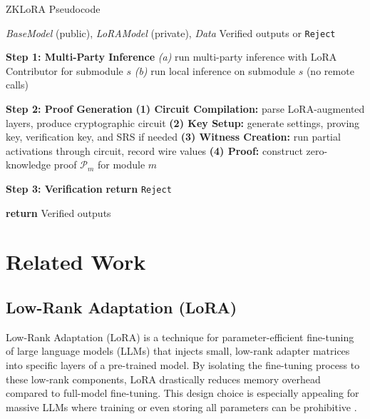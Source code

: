 \documentclass[11pt]{article}
\begin{document}
\begin{algorithm}[H]
\caption{ZKLoRA Pseudocode}
\label{alg:zklora_concise}
\begin{algorithmic}[1]

\Require \textit{BaseModel} (public), \textit{LoRAModel} (private), \textit{Data}
\Ensure Verified outputs or \texttt{Reject}

\Statex

\State \textbf{Step 1: Multi-Party Inference}
    \State \emph{(a)} run multi-party inference with LoRA Contributor for submodule $s$
  \Else
    \State \emph{(b)} run local inference on submodule $s$ (no remote calls)
  \EndIf
\EndFor

\Statex

\State \textbf{Step 2: Proof Generation}
  \State \textbf{(1) Circuit Compilation:} parse LoRA-augmented layers, produce cryptographic circuit
  \State \textbf{(2) Key Setup:} generate settings, proving key, verification key, and SRS if needed
  \State \textbf{(3) Witness Creation:} run partial activations through circuit, record wire values
  \State \textbf{(4) Proof:} construct zero-knowledge proof $\mathcal{P}_m$ for module $m$
\EndFor

\Statex

\State \textbf{Step 3: Verification}
    \State \textbf{return} \texttt{Reject}
  \EndIf
\EndFor

\State \textbf{return} Verified outputs

\end{algorithmic}
\end{algorithm}



\section{Related Work}

\subsection{Low-Rank Adaptation (LoRA)}
Low-Rank Adaptation (LoRA) \cite{hu2021lora} is a technique for parameter-efficient fine-tuning of large language models (LLMs) that injects small, low-rank adapter matrices into specific layers of a pre-trained model. By isolating the fine-tuning process to these low-rank components, LoRA drastically reduces memory overhead compared to full-model fine-tuning. This design choice is especially appealing for massive LLMs where training or even storing all parameters can be prohibitive \cite{ding2022delta}.
\end{document}
